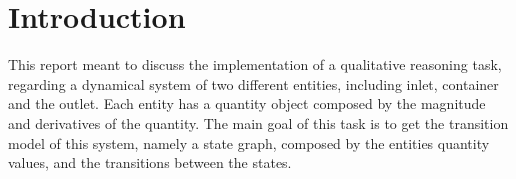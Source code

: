 \cite{Bredeweg06garp3-}

\section{Introduction}

This report meant to discuss the implementation of a qualitative reasoning task, regarding a dynamical system of two different entities, including inlet, container and the outlet. Each entity has a quantity object composed by the magnitude and derivatives of the quantity. The main goal of this task is to get the transition model of this system, namely a state graph, composed by the entities quantity values, and the transitions between the states.
